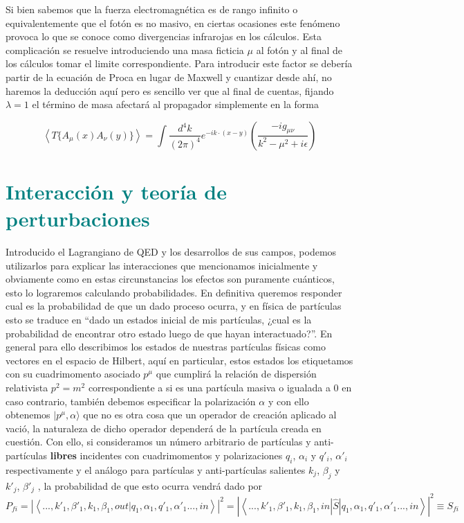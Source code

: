 \documentclass{article}
\numberwithin{equation}{section}
\begin{document}
Si bien sabemos que la fuerza electromagnética es de rango infinito o equivalentemente que el fotón es no masivo, en ciertas ocasiones este fenómeno provoca lo que se conoce como divergencias infrarojas en los cálculos. Esta complicación se resuelve introduciendo una masa ficticia $ \mu $ al fotón y al final de los cálculos tomar el limite correspondiente. Para introducir este factor se debería partir de la ecuación de Proca en lugar de Maxwell y cuantizar desde ahí, no haremos la deducción aquí pero es sencillo ver que al final de cuentas, fijando $ \lambda=1 $ el término de masa afectará al propagador simplemente en la forma

\begin{equation}\label{prop_fotonmu}
\left\langle T\{A_{\mu}(x)A_{\nu}(y)\} \right\rangle =\int\frac{d^{4}k}{(2\pi)^{4}}e^{-ik\cdot(x-y)}\left(\frac{-ig_{\mu\nu}}{k^2 -\mu^2 +i\epsilon}\right)
\end{equation} 

\section{\textcolor{teal}{Interacción y teoría de perturbaciones}}

Introducido el Lagrangiano de QED y los desarrollos de sus campos, podemos utilizarlos para explicar
las interacciones que mencionamos inicialmente y obviamente como en
estas circunstancias los efectos son puramente cuánticos, esto lo
lograremos calculando probabilidades. En definitiva queremos responder
cual es la probabilidad de que un dado proceso ocurra, y en física
de partículas esto se traduce en ``dado un estados inicial de mis
partículas, ¿cual es la probabilidad de encontrar otro estado luego
de que hayan interactuado?''. En general para ello describimos los
estados de nuestras partículas físicas como vectores en el espacio
de Hilbert, aquí en particular, estos estados los etiquetamos con
su cuadrimomento asociado $p^{\mu}$ que cumplirá la relación de dispersión
relativista $p^{2}=m^{2}$ correspondiente a si es una partícula masiva
o igualada a $ 0 $ en caso contrario, también debemos especificar la polarización $\alpha$
y con ello obtenemos $|p^{\mu},\alpha \rangle$ que no es otra cosa que un
operador de creación aplicado al vació, la naturaleza de dicho operador
dependerá de la partícula creada en cuestión. Con ello, si consideramos
un número arbitrario de partículas y anti-partículas \textbf{libres
}incidentes con cuadrimomentos y polarizaciones $q_{i}$, $\alpha_{i}$
y $q'_{i}$, $\alpha'_{i}$ respectivamente y el análogo para partículas
y anti-partículas salientes $k_{j}$, $\beta_{j}$
y $k'_{j}$, $\beta'_{j}$ , la probabilidad de que esto ocurra vendrá
dado por
\begin{equation}
P_{fi}=\left|\left\langle ...,k'_{1},\beta'_{1},k_{1},\beta_{1},out|q_{1},\alpha_{1},q'_{1},\alpha'_{1}...,in\right\rangle \right|^{2}=\left|\left\langle ...,k'_{1},\beta'_{1},k_{1},\beta_{1},in|\hat{S}|q_{1},\alpha_{1},q'_{1},\alpha'_{1}...,in\right\rangle \right|^{2}\equiv S_{fi}
\end{equation}
\end{document}
